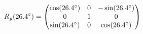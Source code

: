 \documentclass[preview]{standalone}
\begin{document}
\begin{align*}
\special{dvisvgm:raw <g id='unique000'>}R_y(26.4^\circ) = \begin{pmatrix} \cos(26.4^\circ) & 0 & -\sin(26.4^\circ) \\ 0 & 1 & 0 \\ \sin(26.4^\circ) & 0 & \cos(26.4^\circ) \end{pmatrix}\special{dvisvgm:raw </g>}
\end{align*}
\end{document}
